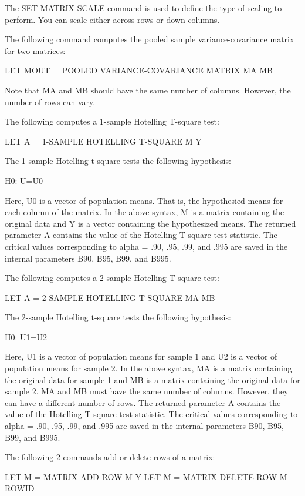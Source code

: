 {    The SET MATRIX SCALE command is used to define the type of
    scaling to perform.  You can scale either across rows or down
    columns.
   
    The following command computes the pooled sample
    variance-covariance matrix for two matrices:

         LET MOUT = POOLED VARIANCE-COVARIANCE MATRIX MA MB
    
    Note that MA and MB should have the same number of columns.
    However, the number of rows can vary.

    The following computes a 1-sample Hotelling T-square test:

         LET A = 1-SAMPLE HOTELLING T-SQUARE M Y

    The 1-sample Hotelling t-square tests the following hypothesis:

         H0: U=U0

    Here, U0 is a vector of population means.  That is, the
    hypothesied means for each column of the matrix.  In the
    above syntax, M is a matrix containing the original data
    and Y is a vector containing the hypothesized means.  The
    returned parameter A contains the value of the Hotelling
    T-square test statistic.  The critical values corresponding
    to alpha = .90, .95, .99, and .995 are saved in the internal
    parameters B90, B95, B99, and B995.

    The following computes a 2-sample Hotelling T-square test:

         LET A = 2-SAMPLE HOTELLING T-SQUARE MA MB

    The 2-sample Hotelling t-square tests the following hypothesis:

         H0: U1=U2

    Here, U1 is a vector of population means for sample 1 and
    U2 is a vector of population means for sample 2.  In the
    above syntax, MA is a matrix containing the original data
    for sample 1 and MB is a matrix containing the original data
    for sample 2.  MA and MB must have the same number of columns.
    However, they can have a different number of rows.  The
    returned parameter A contains the value of the Hotelling
    T-square test statistic.  The critical values corresponding
    to alpha = .90, .95, .99, and .995 are saved in the internal
    parameters B90, B95, B99, and B995.

    The following 2 commands add or delete rows of a matrix:

        LET M = MATRIX ADD ROW M Y
        LET M = MATRIX DELETE ROW M ROWID

}

